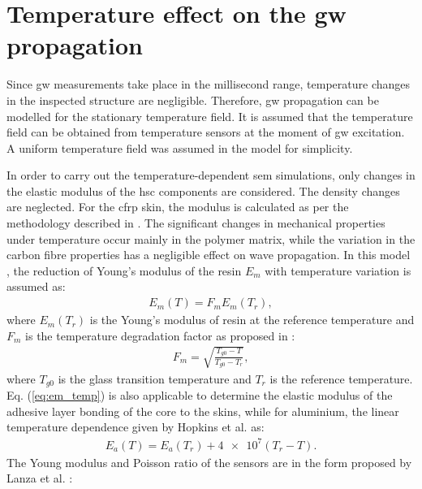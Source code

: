 \section{Temperature effect on the \acs{gw} propagation}
\label{sec:temp}
 
Since \ac{gw} measurements take place in the millisecond range, temperature changes in the inspected structure are negligible.
Therefore, \ac{gw} propagation can be modelled for the stationary temperature field.
It is assumed that the temperature field can be obtained from temperature sensors at the moment of \ac{gw} excitation.
A uniform temperature field was assumed in the model for simplicity.

In order to carry out the temperature-dependent \ac{sem} simulations, only changes in the elastic modulus of the \ac{hsc} components are considered.
The density changes are neglected. For the \ac{cfrp} skin, the modulus is calculated as per the methodology described in \cite{chamis1983simplified,salamone2009guided}.
The significant changes in mechanical properties under temperature occur mainly in the polymer matrix, while the variation in the carbon fibre properties has a negligible effect on wave propagation.
In this model \cite{salamone2009guided, hopkins2012extreme}, the reduction of Young’s modulus of the resin \(E_m\) with temperature variation is assumed as:
\begin{eqnarray}
	E_m(T)=F_m E_{m}(T_r),
	\label{eq:factor_temp}
\end{eqnarray}
where \(E_{m}(T_r)\) is the Young’s modulus of resin at the reference temperature and \(F_m\) is the temperature degradation factor as proposed in \cite{chamis1983simplified}:
\begin{eqnarray}
F_m=\sqrt{\frac{T_{g0}-T}{T_{g0}-T_r}},
\label{eq:em_temp}
\end{eqnarray}
where \(T_{g0}\) is the glass transition temperature and \(T_r\) is the reference temperature.
Eq. (\ref{eq:em_temp}) is also applicable to determine the elastic modulus of the adhesive layer bonding of the core to the skins, while for aluminium, the linear temperature dependence given by Hopkins et al. \cite{hopkins2012extreme} as:
\begin{eqnarray}
	E_a(T)=E_a(T_{r})+\num{4e7}(T_r-T).
	\label{eq:aluminium_temp}
\end{eqnarray}
The Young modulus and Poisson ratio of the sensors are in the form proposed by Lanza et al. \cite{lanza2008temperature}:
